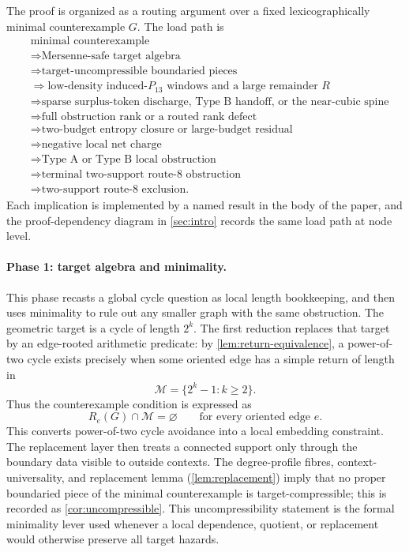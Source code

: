\documentclass[11pt]{article}
\newcommand{\Mers}{\mathcal M}
\begin{document}
The proof is organized as a routing argument over a fixed lexicographically minimal
counterexample $G$.  The load path is
\[
\begin{aligned}
&\text{minimal counterexample}\\
&\Rightarrow \text{Mersenne-safe target algebra}\\
&\Rightarrow \text{target-uncompressible boundaried pieces}\\
&\Rightarrow \text{low-density induced-}P_{13}\text{ windows and a large remainder }R\\
&\Rightarrow \text{sparse surplus-token discharge, Type B handoff, or the near-cubic spine}\\
&\Rightarrow \text{full obstruction rank or a routed rank defect}\\
&\Rightarrow \text{two-budget entropy closure or large-budget residual}\\
&\Rightarrow \text{negative local net charge}\\
&\Rightarrow \text{Type A or Type B local obstruction}\\
&\Rightarrow \text{terminal two-support route-8 obstruction}\\
&\Rightarrow \text{two-support route-8 exclusion.}
\end{aligned}
\]
Each implication is implemented by a named result in the body of the paper, and
the proof-dependency diagram in \cref{sec:intro} records the same load path at
node level.

\paragraph{Phase 1: target algebra and minimality.}
This phase recasts a global cycle question as local length bookkeeping, and
then uses minimality to rule out any smaller graph with the same obstruction.
The geometric target is a cycle of length $2^k$.  The first reduction replaces
that target by an edge-rooted arithmetic predicate: by
\cref{lem:return-equivalence}, a power-of-two cycle exists precisely when some
oriented edge has a simple return of length in
\[
\Mers=\{2^k-1:k\ge2\}.
\]
Thus the counterexample condition is expressed as
\[
R_e(G)\cap \Mers=\varnothing
\qquad\text{for every oriented edge }e .
\]
This converts power-of-two cycle avoidance into a local embedding constraint.  The
replacement layer then treats a connected support only through the boundary
data visible to outside contexts.  The degree-profile fibres,
context-universality, and replacement lemma
(\cref{lem:replacement}) imply that no proper boundaried piece of the minimal
counterexample is target-compressible; this is recorded as
\cref{cor:uncompressible}.  This uncompressibility statement is the formal
minimality lever used whenever a local dependence, quotient, or replacement
would otherwise preserve all target hazards.
\end{document}
